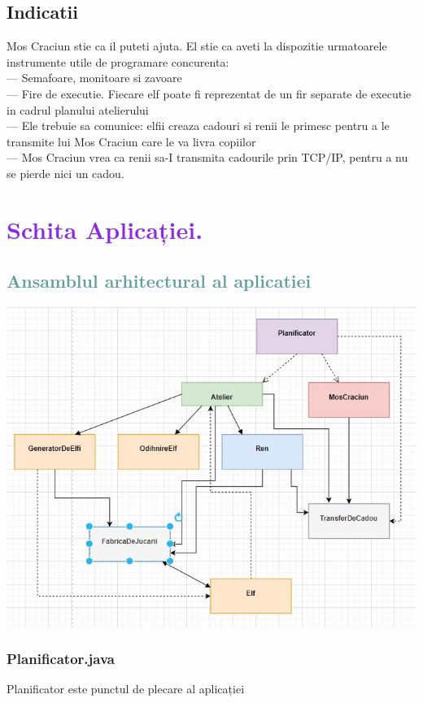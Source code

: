 \documentclass{article}
\begin{document}
\subsection{\textcolor{Periwinkle}{Indicatii}}
Mos Craciun stie ca il puteti ajuta. El stie ca aveti la dispozitie urmatoarele instrumente utile de programare concurenta:\\
--- Semafoare, monitoare si zavoare\\
--- Fire de executie. Fiecare elf poate fi reprezentat de un fir separate de executie in cadrul planului atelierului\\
--- Ele trebuie sa comunice: elfii creaza cadouri si renii le primesc pentru a le transmite lui Mos Craciun care le va livra copiilor\\
--- Mos Craciun vrea ca renii sa-I transmita cadourile prin TCP/IP, pentru a nu se pierde nici un cadou.\\

\section{\textcolor{BlueViolet}{Schita Aplicației.}}\label{sec_tr}
\subsection{\textcolor{CadetBlue}{Ansamblul arhitectural al aplicatiei}}
  \begin{center}
    \textbf{\includegraphics[scale=1.0]{Arhitectura.jpg}}
\end{center}
\subsubsection{\textcolor{Periwinkle}{Planificator.java}}
\textcolor{Mulberry}{Planificator} este  punctul de plecare al aplicației 
\end{document}
